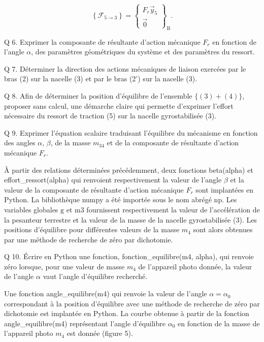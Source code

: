 \documentclass[10pt]{article}
\begin{document}
$$
\left\{\mathcal{F}_{5 \rightarrow 3}\right\}=\left\{\begin{array}{c}
F_{r} \vec{y}_{5} \\
\overrightarrow{0}
\end{array}\right\}_{\mathrm{B}} .
$$

Q 6. Exprimer la composante de résultante d'action mécanique $F_{r}$ en fonction de l'angle $\alpha$, des paramètres géométriques du système et des paramètres du ressort.

Q 7. Déterminer la direction des actions mécaniques de liaison exercées par le bras (2) sur la nacelle (3) et par le bras (2') sur la nacelle (3).

Q 8. Afin de déterminer la position d'équilibre de l'ensemble $\{(3)+(4)\}$, proposer sans calcul, une démarche claire qui permette d'exprimer l'effort nécessaire du ressort de traction (5) sur la nacelle gyrostabilisée (3).

Q 9. Exprimer l'équation scalaire traduisant l'équilibre du mécanisme en fonction des angles $\alpha$, $\beta$, de la masse $m_{34}$ et de la composante de résultante d'action mécanique $F_{r}$.

À partir des relations déterminées précédemment, deux fonctions beta(alpha) et effort\_ressort(alpha) qui renvoient respectivement la valeur de l'angle $\beta$ et la valeur de la composante de résultante d'action mécanique $F_{r}$ sont implantées en Python. La bibliothèque numpy a été importée sous le nom abrégé np. Les variables globales $\mathrm{g}$ et $\mathrm{m} 3$ fournissent respectivement la valeur de l'accélération de la pesanteur terrestre et la valeur de la masse de la nacelle gyrostabilisée (3). Les positions d'équilibre pour différentes valeurs de la masse $m_{4}$ sont alors obtenues par une méthode de recherche de zéro par dichotomie.

Q 10. Écrire en Python une fonction, fonction\_equilibre(m4, alpha), qui renvoie zéro lorsque, pour une valeur de masse $m_{4}$ de l'appareil photo donnée, la valeur de l'angle $\alpha$ vaut l'angle d'équilibre recherché.

Une fonction angle\_equilibre(m4) qui renvoie la valeur de l'angle $\alpha=\alpha_{0}$ correspondant à la position d'équilibre avec une méthode de recherche de zéro par dichotomie est implantée en Python. La courbe obtenue à partir de la fonction angle\_equilibre(m4) représentant l'angle d'équilibre $\alpha_{0}$ en fonction de la masse de l'appareil photo $m_{4}$ est donnée (figure 5).
\end{document}
